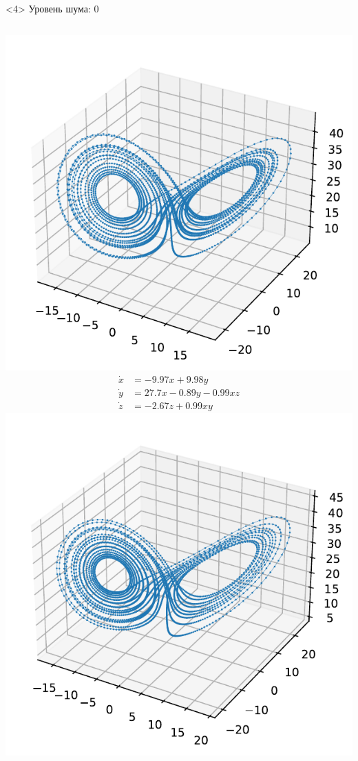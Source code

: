 \documentclass[pdf, hyperref={unicode}, aspectratio=169]{beamer}
\begin{document}
\begin{frame}
\begin{onlyenv}<4>
Уровень шума: $0$
\vfill
\begin{columns}
  \includegraphics[height=\linewidth]{img/ex1_orig}
  \begin{align*}
  \dot{x} &= -9.97 x + 9.98 y \\
  \dot{y} &= 27.7 x - 0.89 y - 0.99 x z \\
  \dot{z} &= -2.67 z + 0.99 x y
  \end{align*}
  \includegraphics[height=\linewidth]{img/ex1_res}

\end{columns}
\end{onlyenv}
\end{frame}
\end{document}
